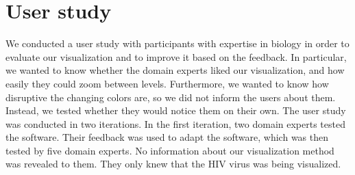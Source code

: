 \documentclass[review,journal]{vgtc}         %
\begin{document}
%
%

\section{User study}
We conducted a user study with participants with expertise in biology in order to evaluate our visualization and to improve it based on the feedback.
In particular, we wanted to know whether the domain experts liked our visualization, and how easily they could zoom between levels. 
Furthermore, we wanted to know how disruptive the changing colors are, so we did not inform the users about them. Instead, we tested whether they would notice them on their own.
The user study was conducted in two iterations. 
In the first iteration, two domain experts tested the software. 
Their feedback was used to adapt the software, which was then tested by five domain experts.
No information about our visualization method was revealed to them. They only knew that the HIV virus was being visualized.
\end{document}
